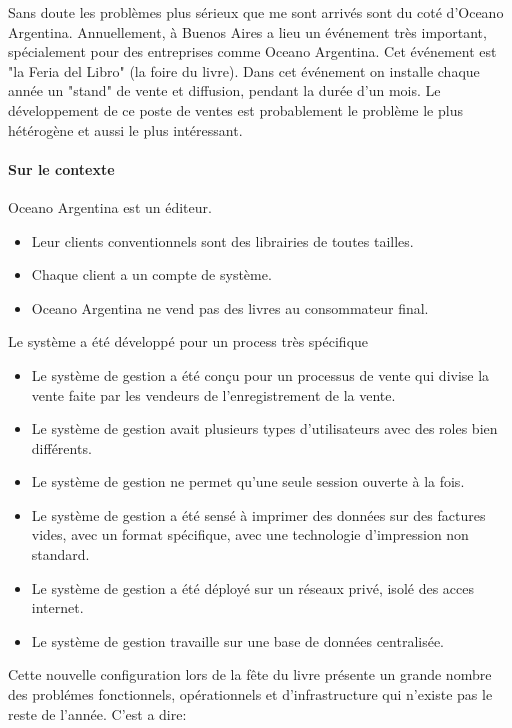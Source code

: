 \documentclass{resume} %
\begin{document}
		Sans doute les problèmes plus sérieux que me sont arrivés sont du coté d'Oceano Argentina. 
		Annuellement, \`a Buenos Aires a lieu un événement très important, spécialement pour des entreprises comme Oceano Argentina. Cet événement est "la Feria del Libro" (la foire du livre). 
		Dans cet événement on installe chaque année un "stand" de vente et diffusion, pendant la durée d'un mois. 	
		Le développement de ce poste de ventes est probablement le problème le plus hétérogène et aussi le plus intéressant. 
		
		\paragraph{ Sur le contexte } 
		
		Oceano Argentina est un \'editeur. 
		
		\begin {itemize} 
		 \item Leur clients conventionnels sont des librairies de toutes tailles.
		 \item Chaque client a un compte de système.
		 \item Oceano Argentina ne vend pas des livres au consommateur final.
		\end{itemize}
		
		Le système a été développé pour un process très spécifique 
		\begin{itemize} 
		   \item Le système de gestion a été conçu pour un processus de vente qui divise la vente faite par les vendeurs de l'enregistrement de la vente.
		   \item Le système de gestion avait plusieurs types d'utilisateurs avec des roles bien différents.
		   \item Le système de gestion ne permet qu'une seule session ouverte \`a la fois.
		   \item Le système de gestion a été  sensé \`a imprimer des donn\'ees sur des factures vides, avec un format spécifique, avec une technologie d'impression non standard.
		   \item Le système de gestion a été déployé sur un réseaux privé, isolé des acces internet.
		   \item Le système de gestion travaille sur une base de données centralisée.
		\end{itemize} 
		
		Cette nouvelle configuration lors de la fête du livre pr\'esente un grande nombre des problémes fonctionnels, opérationnels et d'infrastructure  qui n'existe pas le reste de l'année. C'est a dire: 
		
\end{document}
